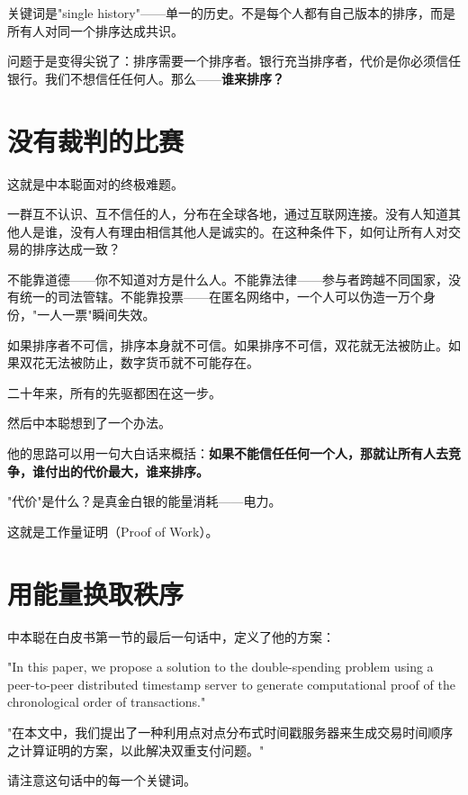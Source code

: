 \documentclass[a4paper,12pt,openany]{ctexbook}
\newenvironment{quoting}{%
  \par\vspace{0.5em}%
  \begin{list}{}{%
    \setlength{\leftmargin}{2em}%
    \setlength{\rightmargin}{2em}%
    \setlength{\parsep}{0.3em}%
    \setlength{\itemsep}{0pt}%
    \setlength{\topsep}{0pt}%
  }%
  \item\relax
}{%
  \end{list}%
  \par\vspace{0.5em}%
}
\begin{document}
关键词是"single history"——单一的历史。不是每个人都有自己版本的排序，而是所有人对同一个排序达成共识。

问题于是变得尖锐了：排序需要一个排序者。银行充当排序者，代价是你必须信任银行。我们不想信任任何人。那么——\textbf{谁来排序？}


\section*{没有裁判的比赛}


这就是中本聪面对的终极难题。

一群互不认识、互不信任的人，分布在全球各地，通过互联网连接。没有人知道其他人是谁，没有人有理由相信其他人是诚实的。在这种条件下，如何让所有人对交易的排序达成一致？

不能靠道德——你不知道对方是什么人。不能靠法律——参与者跨越不同国家，没有统一的司法管辖。不能靠投票——在匿名网络中，一个人可以伪造一万个身份，"一人一票"瞬间失效。

如果排序者不可信，排序本身就不可信。如果排序不可信，双花就无法被防止。如果双花无法被防止，数字货币就不可能存在。

二十年来，所有的先驱都困在这一步。

然后中本聪想到了一个办法。

他的思路可以用一句大白话来概括：\textbf{如果不能信任任何一个人，那就让所有人去竞争，谁付出的代价最大，谁来排序。}

"代价"是什么？是真金白银的能量消耗——电力。

这就是工作量证明（Proof of Work）。


\section*{用能量换取秩序}


中本聪在白皮书第一节的最后一句话中，定义了他的方案：


\begin{quoting}
\small
"In this paper, we propose a solution to the double-spending problem using a peer-to-peer distributed timestamp server to generate computational proof of the chronological order of transactions."

"在本文中，我们提出了一种利用点对点分布式时间戳服务器来生成交易时间顺序之计算证明的方案，以此解决双重支付问题。"
\end{quoting}


请注意这句话中的每一个关键词。
\end{document}
